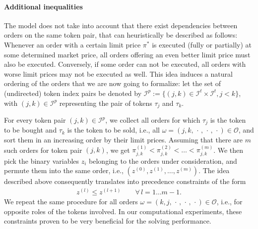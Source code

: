 \documentclass[11pt,parskip=full]{scrartcl}%
\newcommand*{\ie}{i.e., }
\newcommand*{\orders}{\mathcal{O}}          %
\newcommand*{\itokens}{\mathcal{I}^t}       %
\newcommand*{\itokenpairs}{\mathcal{I}^p}   %
\begin{document}
\vspace{-.5cm}
\paragraph{Additional inequalities}

The model does not take into account that there exist dependencies between orders on the same token
pair, that can heuristically be described as follows:
Whenever an order with a certain limit price $ \pi^* $ is executed (fully or partially) at some
determined market price, all orders offering an even better limit price must also be executed.
Conversely, if some order can not be executed, all orders with worse limit prices may not be
executed as well.
This idea induces a natural ordering of the orders that we are now going to formalize:
let the set of (undirected) token index pairs be denoted by
$ \itokenpairs := \{(j,k) \in \itokens \times \itokens, j < k\} $, with $ (j,k) \in \itokenpairs $
representing the pair of tokens $ \tau_j $ and $ \tau_k $.

For every token pair $ (j,k) \in \itokenpairs $, we collect all orders for which $ \tau_j $ is the
token to be bought and $ \tau_k $ is the token to be sold, \ie all
$ \omega = (j, k,\, \cdot \,,\, \cdot \,,\, \cdot) \in \orders $,
and sort them in an increasing order by their limit prices.
Assuming that there are $ m $ such orders for token pair $ (j,k) $, we get
$ \pi^{(1)}_{j,k} < \pi^{(2)}_{j,k} < \ldots < \pi^{(m)}_{j,k} $.
We then pick the binary variables $ z_i $ belonging to the orders under consideration, and permute
them into the same order, \ie $ (z^{(0)}, z^{(1)}, \ldots, z^{(m)}) $.
The idea described above consequently translates into precedence constraints of the form
\begin{align}
  z^{(l)} \le z^{(l+1)} \qquad \forall \, l = 1 \ldots m\!-\!1.
  \label{eq:mip1_order_precedence}
\end{align}
We repeat the same procedure for all orders
$ \omega = (k, j,\, \cdot \,,\, \cdot \,,\, \cdot) \in \orders $,
\ie for opposite roles of the tokens involved.
In our computational experiments, these constraints proven to be very beneficial for the solving
performance.
\end{document}
